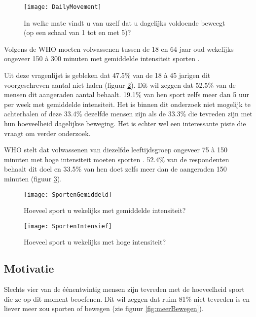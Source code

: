 \begin{figure}
    \caption[In welke mate vindt u van uzelf dat u dagelijks voldoende beweegt?]{In welke mate vindt u van uzelf dat u dagelijks voldoende beweegt (op een schaal van 1 tot en met 5)?}
    \texttt{[image: DailyMovement]}
    \label{fig:dagelijkseBeweging}
\end{figure}

Volgens de WHO moeten volwassenen tussen de 18 en 64 jaar oud wekelijks ongeveer 150 à 300 minuten met gemiddelde intensiteit sporten \autocite{Bull2020}.

Uit deze vragenlijst is gebleken dat 47.5\% van de 18 à 45 jarigen dit voorgeschreven aantal niet halen (figuur \ref{fig:gemiddeldSporten}). Dit wil zeggen dat 52.5\% van de mensen dit aangeraden aantal behaalt. 19.1\% van hen sport zelfs meer dan 5 uur per week met gemiddelde intensiteit. Het is binnen dit onderzoek niet mogelijk te achterhalen of deze 33.4\% dezelfde mensen zijn als de 33.3\% die tevreden zijn met hun hoeveelheid dagelijkse beweging. Het is echter wel een interessante piste die vraagt om verder onderzoek.

WHO stelt dat volwassenen van diezelfde leeftijdsgroep ongeveer 75 à 150 minuten met hoge intensiteit moeten sporten \autocite{Bull2020}.
52.4\% van de respondenten behaalt dit doel en 33.5\% van hen doet zelfs meer dan de aangeraden 150 minuten (figuur \ref{fig:intensiefSporten}).

\begin{figure}[h]
    \caption[Hoeveel sport u wekelijks met gemiddelde intensiteit?]{Hoeveel sport u wekelijks met gemiddelde intensiteit?}
    \texttt{[image: SportenGemiddeld]}
    \label{fig:gemiddeldSporten}
\end{figure}

\begin{figure}[h]
    \caption[Hoeveel sport u wekelijks met hoge intensiteit?]{Hoeveel sport u wekelijks met hoge intensiteit?}
    \texttt{[image: SportenIntensief]}
    \label{fig:intensiefSporten}
\end{figure}

\subsection{Motivatie}

Slechts vier van de éénentwintig mensen zijn tevreden met de hoeveelheid sport die ze op dit moment beoefenen. Dit wil zeggen dat ruim 81\% niet tevreden is en liever meer zou sporten of bewegen (zie figuur \ref{fig:meerBewegen}).

